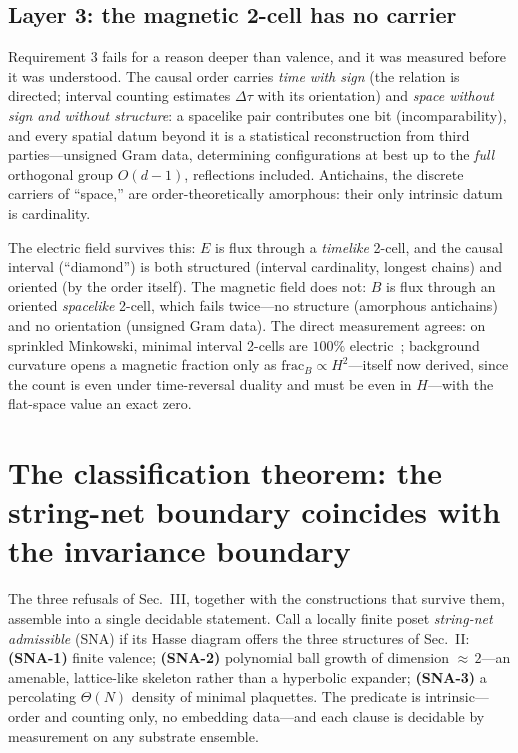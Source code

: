 \documentclass[aps,prd,reprint,nofootinbib,superscriptaddress,floatfix]{revtex4-2}
\begin{document}
\subsection{Layer 3: the magnetic 2-cell has no carrier}

Requirement 3 fails for a reason deeper than valence, and it was measured before it was
understood. The causal order carries \emph{time with sign} (the relation is directed;
interval counting estimates $\Delta\tau$ with its orientation) and \emph{space without
sign and without structure}: a spacelike pair contributes one bit (incomparability), and
every spatial datum beyond it is a statistical reconstruction from third
parties---unsigned Gram data, determining configurations at best up to the \emph{full}
orthogonal group $O(d{-}1)$, reflections included. Antichains, the discrete carriers of
``space,'' are order-theoretically amorphous: their only intrinsic datum is cardinality.

The electric field survives this: $E$ is flux through a \emph{timelike} 2-cell, and the
causal interval (``diamond'') is both structured (interval cardinality, longest chains)
and oriented (by the order itself). The magnetic field does not: $B$ is flux through an
oriented \emph{spacelike} 2-cell, which fails twice---no structure (amorphous
antichains) and no orientation (unsigned Gram data). The direct measurement agrees: on
sprinkled Minkowski, minimal interval 2-cells are $100\%$
electric~\cite{MatterGravityPRD}; background curvature opens a magnetic fraction only as
$\mathrm{frac}_B\propto H^2$---itself now derived, since the count is even under
time-reversal duality and must be even in $H$---with the flat-space value an exact zero.

\section{The classification theorem: the string-net boundary coincides with the
invariance boundary}

The three refusals of Sec.~III, together with the constructions that survive them,
assemble into a single decidable statement. Call a locally finite poset
\emph{string-net admissible} (SNA) if its Hasse diagram offers the three structures of
Sec.~II: \textbf{(SNA-1)} finite valence; \textbf{(SNA-2)} polynomial ball growth of
dimension ${\approx}\,2$---an amenable, lattice-like skeleton rather than a
hyperbolic expander; \textbf{(SNA-3)} a percolating $\Theta(N)$ density of minimal
plaquettes. The predicate is intrinsic---order and counting only, no embedding
data---and each clause is decidable by measurement on any substrate ensemble.
\end{document}
